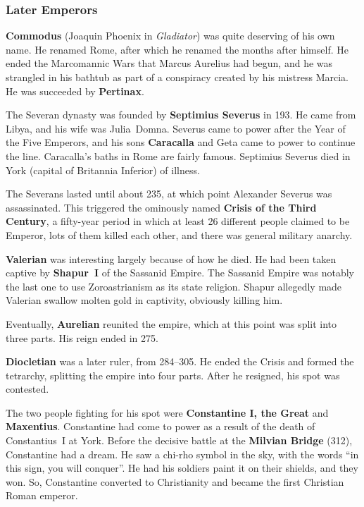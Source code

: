 \subsubsection*{Later Emperors}

\textbf{Commodus} (Joaquin Phoenix in \textit{Gladiator}) was quite deserving of his own name.
He renamed Rome, after which he renamed the months after himself.
He ended the Marcomannic Wars that Marcus Aurelius had begun,
and he was strangled in his bathtub as part of a conspiracy created by his mistress Marcia.
He was succeeded by \textbf{Pertinax}.

The Severan dynasty was founded by \textbf{Septimius Severus} in 193.
He came from Libya, and his wife was Julia~Domna.
Severus came to power after the Year of the Five Emperors,
and his sons \textbf{Caracalla} and Geta came to power to continue the line.
Caracalla's baths in Rome are fairly famous.
Septimius Severus died in York (capital of Britannia Inferior) of illness.

The Severans lasted until about 235,
at which point Alexander Severus was assassinated.
This triggered the ominously named \textbf{Crisis of the Third Century},
a fifty-year period in which at least 26 different people claimed to be Emperor,
lots of them killed each other, and there was general military anarchy.

\textbf{Valerian} was interesting largely because of how he died.
He had been taken captive by \textbf{Shapur~I} of the Sassanid Empire.
The Sassanid Empire was notably the last one to use Zoroastrianism as its state religion.
Shapur allegedly made Valerian swallow molten gold in captivity, obviously killing him.

Eventually, \textbf{Aurelian} reunited the empire, which at this point was split into three parts.
His reign ended in 275.

\textbf{Diocletian} was a later ruler, from 284--305.
He ended the Crisis and formed the tetrarchy, splitting the empire into four parts.
After he resigned, his spot was contested.

The two people fighting for his spot were \textbf{Constantine I, the Great} and \textbf{Maxentius}.
Constantine had come to power as a result of the death of Constantius~I at York.
Before the decisive battle at the \textbf{Milvian Bridge} (312), Constantine had a dream.
He saw a chi-rho symbol in the sky, with the words ``in this sign, you will conquer''.
He had his soldiers paint it on their shields, and they won.
So, Constantine converted to Christianity and became the first Christian Roman emperor.

